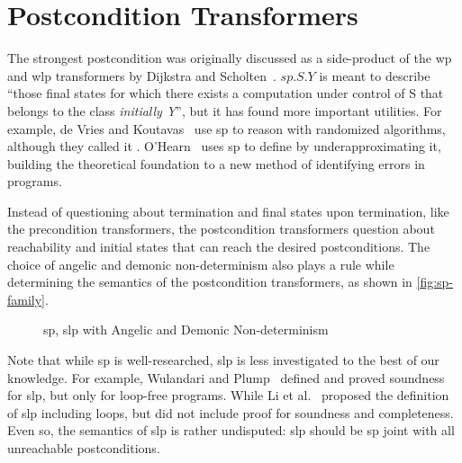 \section{Postcondition Transformers}
The strongest postcondition was originally discussed as a side-product of the wp and wlp transformers by Dijkstra and Scholten~\cite{dijkstra90}. 
$sp.S.Y$ is meant to describe ``those final states for which there exists a computation under control of S that belongs to the class \textit{initially Y}'', but it has found more important utilities. 
For example, de Vries and Koutavas~\cite{vries11} use sp to reason with randomized algorithms, although they called it . 
O'Hearn~\cite{ohearn2020IncorrectnessLogic} uses sp to define  by underapproximating it, building the theoretical foundation to a new method of identifying errors in programs. 

Instead of questioning about termination and final states upon termination, like the precondition transformers, the postcondition transformers question about reachability and initial states that can reach the desired postconditions. 
The choice of angelic and demonic non-determinism also plays a rule while determining the semantics of the postcondition transformers, as shown in \autoref{fig:sp-family}. 

\begin{figure}[ht!]\centering
	\hfill

	\hfill
	\caption{sp, slp with Angelic and Demonic Non-determinism}
	\label{fig:sp-family}
\end{figure}

Note that while sp is well-researched, slp is less investigated to the best of our knowledge. 
For example, Wulandari and Plump~\cite{wulandari2020VerifyingGraphPrograms} defined and proved soundness for slp, but only for loop-free programs. 
While Li et al.~\cite{li2011NonlinearMathematicsUncertainty} proposed the definition of slp including loops, but did not include proof for soundness and completeness. 
Even so, the semantics of slp is rather undisputed: slp should be sp joint with all unreachable postconditions. 

